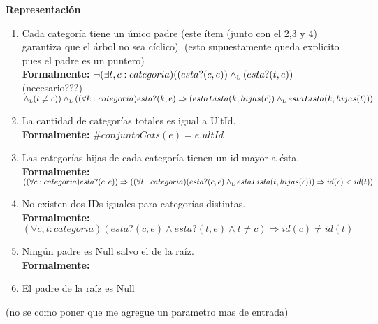 \documentclass[10pt, a4paper]{article}
\newenvironment{Representacion}{%
  \vspace*{2ex}%
  \noindent\textbf{\Large Representaci\'on}%
  \vspace*{2ex}%
}{}
\newenvironment{Servicios Usados}{%
  \vspace*{2ex}
  \noindent\textbf{\Large Servicios Usados}%
  \vspace*{2ex}
}{}
\newenvironment{Algoritmos Del Iterador}{%
  \vspace*{2ex}%
  \noindent\textbf{\Large Algoritmos Del Iterador}%
  \vspace*{2ex}%
}{}
\begin{document}
\begin{Representacion}
\begin{enumerate}
  \item Cada categor\'ia tiene un \'unico padre (este \'item (junto con el 2,3 y
  4) garantiza que el \'arbol no sea c\'iclico). (esto supuestamente queda explicito pues el padre es un puntero)\\
        {\bf Formalmente:} $\neg(\exists t,c:categoria)((esta?(c,e)) \land_{\mathrm{\scriptscriptstyle{L}}} (esta?(t,e))$ (necesario???) $\land_{\mathrm{\scriptscriptstyle{L}}} (t \not= c)) \land_{\mathrm{\scriptscriptstyle{L}}} ((\forall k:categoria)esta?(k,e) \Rightarrow (estaLista(k,hijas(c)) \land_{\mathrm{\scriptscriptstyle{L}}} estaLista(k,hijas(t)))$
  
  \item La cantidad de categor\'ias totales es igual a UltId.\\
        {\bf Formalmente:} $\#conjuntoCats(e) = e.ultId$
  
  \item Las categor\'ias hijas de cada categor\'ia tienen un id mayor a \'esta.\\
        {\bf Formalmente:} $((\forall c:categoria)esta?(c,e)) \Rightarrow ((\forall t:categoria)(esta?(c,e) \land_{\mathrm{\scriptscriptstyle{L}}} estaLista(t,hijas(c))) \Rightarrow id(c) < id(t))$
  
  \item No existen dos IDs iguales para categor\'ias distintas.\\
        {\bf Formalmente:} $(\forall c,t:categoria)(esta?(c,e) \land esta?(t,e) \land t \not= c) \Rightarrow id(c) \not =id(t)$
        
  \item Ningún padre es Null salvo el de la raíz. \\
  		{\bf Formalmente:}
  		
  \item El padre de la raíz es Null  \\
  
    
\end{enumerate}


   (no se como poner que me agregue un parametro mas de entrada)
  \tadAxioma{}{}

  ~

  \tadAxioma{}{}

  ~
 

\end{Representacion}
\end{document}
